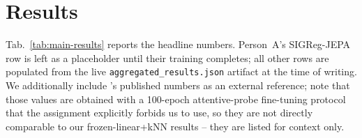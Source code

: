\documentclass{article}
\begin{document}
\section{Results}
\label{sec:results}

Tab.~\ref{tab:main-results} reports the headline numbers. Person~A's
SIGReg-JEPA row is left as a placeholder until their training completes; all
other rows are populated from the live \texttt{aggregated\_results.json}
artifact at the time of writing. We additionally include
\citet{qu2026spatiotemporal}'s published numbers as an external reference; note
that those values are obtained with a 100-epoch attentive-probe fine-tuning
protocol that the assignment explicitly forbids us to use, so they are not
directly comparable to our frozen-linear+kNN results -- they are listed for
context only.
\end{document}
